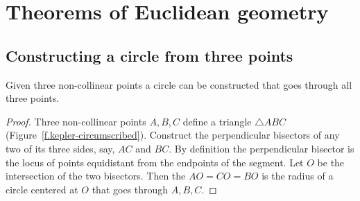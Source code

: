 
\chapter{Theorems of Euclidean geometry}\label{s.elementary}

\section{Constructing a circle from three points}

\begin{theorem}\label{thm.three-points}
Given three non-collinear points a circle can be constructed that goes through all three points.
\end{theorem}

\begin{proof}
Three non-collinear points $A,B,C$ define a triangle $\triangle ABC$ (Figure~\ref{f.kepler-circumscribed}). Construct the perpendicular bisectors of any two of its three sides, say, $AC$ and $BC$. By definition the perpendicular bisector is the locus of points equidistant from the endpoints of the segment. Let $O$ be the intersection of the two bisectors. Then the $AO=CO=BO$ is the radius of a circle centered at $O$ that goes through $A,B,C$.\hqed
\end{proof}

